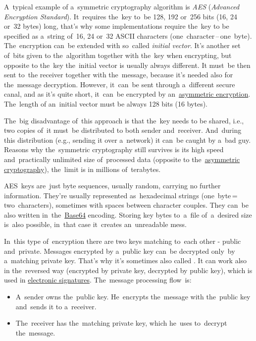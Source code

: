 A~typical example of a~symmetric cryptography algorithm is \textit{AES} (\textit{Advanced Encryption Standard}).
It~requires the~key to~be 128, 192 or~256 bits (16, 24 or~32 bytes) long, that's why some implementations require the~key to be specified as a~string of~16, 24 or~32 ASCII characters (one~character\,--\,one~byte).
The~encryption can~be extended with so~called \textit{initial vector}.
It's another set of~bits given to the~algorithm together with the~key when encrypting, but opposite to the~key the~initial vector is usually always different.
It must~be then sent to~the receiver together with the~message, because it's needed also for the~message decryption.
However, it~can~be sent through a~different secure canal, and as it's quite short, it~can~be encrypted by an~\hyperref[asymmetriccryptography]{asymmetric encryption}.
The~length of an~initial vector must be always 128 bits (16 bytes).

The~big disadvantage of~this approach is that the~key needs to be shared, i.e., two copies of~it must~be distributed to both sender and~receiver.
And~during this distribution (e.g., sending it over a~network) it can~be caught by a~bad guy.
Reasons why the~symmetric cryptography still survives is its high speed and~practically unlimited size of~processed data (opposite to the~\hyperref[asymmetriccryptography]{asymmetric cryptography}), the~limit is in millions of~\mbox{terabytes}.

AES~keys are~just byte sequences, usually random, carrying no further information.
They're usually represented as~hexadecimal strings (one~byte\,=\,two~characters), sometimes with spaces between character couples.
They can~be also written in~the~\hyperref[base64]{\mbox{Base64}} encoding.
Storing key bytes to~a~file of~a~desired size is~also possible, in~that case it~creates an~unreadable mess.
\newpage

\label{asymmetriccryptography}
In~this type of~encryption there are two keys matching to~each other - public and~private.
Messages encrypted by a~public key can~be decrypted only~by a~matching private key.
That's why it's sometimes also called .
It can work also in the~reversed way (encrypted by private key, decrypted by public key), which is used in \hyperref[electronicsignature]{electronic signatures}.
The~message processing flow~is:
\begin{itemize}
    \item A~sender owns the~public key.
          He~encrypts the~message with the~public key and~sends it to a~receiver.
    \item The~receiver has the~matching private key, which he~uses to~decrypt the~message.
\end{itemize}

